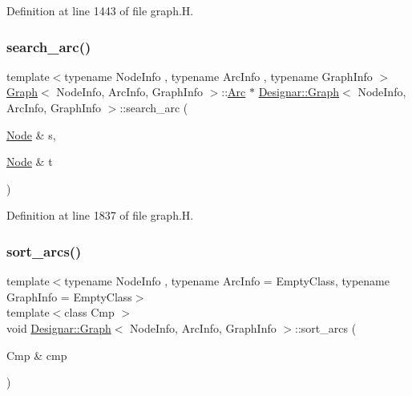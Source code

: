 Definition at line 1443 of file graph.\+H.

\mbox{\label{class_designar_1_1_graph_afa69dd3cc6bacfed22864f5ad7c189ba}} 
\subsubsection{\texorpdfstring{search\+\_\+arc()}{search\_arc()}}
{\footnotesize\ttfamily template$<$typename Node\+Info , typename Arc\+Info , typename Graph\+Info $>$ \\
\hyperlink{class_designar_1_1_graph}{Graph}$<$ Node\+Info, Arc\+Info, Graph\+Info $>$\+::\hyperlink{class_designar_1_1_graph_a74c730ef4ce2d20f998d72bd25c2b5bf}{Arc} $\ast$ \hyperlink{class_designar_1_1_graph}{Designar\+::\+Graph}$<$ Node\+Info, Arc\+Info, Graph\+Info $>$\+::search\+\_\+arc (\begin{DoxyParamCaption}\item[{\hyperlink{class_designar_1_1_graph_a5dfc7dba9d092ac489c72e40390c37d0}{Node} \&}]{s,  }\item[{\hyperlink{class_designar_1_1_graph_a5dfc7dba9d092ac489c72e40390c37d0}{Node} \&}]{t }\end{DoxyParamCaption})}



Definition at line 1837 of file graph.\+H.

\mbox{\label{class_designar_1_1_graph_a39af536f6e08248e0d343dcd300713c2}} 
\subsubsection{\texorpdfstring{sort\+\_\+arcs()}{sort\_arcs()}\hspace{0.1cm}{\footnotesize\ttfamily [1/2]}}
{\footnotesize\ttfamily template$<$typename Node\+Info , typename Arc\+Info  = Empty\+Class, typename Graph\+Info  = Empty\+Class$>$ \\
template$<$class Cmp $>$ \\
void \hyperlink{class_designar_1_1_graph}{Designar\+::\+Graph}$<$ Node\+Info, Arc\+Info, Graph\+Info $>$\+::sort\+\_\+arcs (\begin{DoxyParamCaption}\item[{Cmp \&}]{cmp }\end{DoxyParamCaption})\hspace{0.3cm}{\ttfamily [inline]}}



